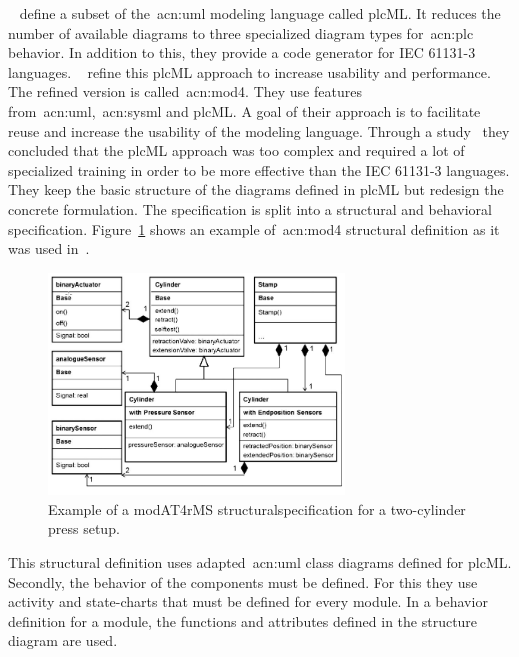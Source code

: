 \citeauthor{WITSCH2015}~\cite{WITSCH2015, WITSCH20117866} define a subset of the~\acrshort{acn:uml} modeling language called plcML.
It reduces the number of available diagrams to three specialized diagram types for~\acrshort{acn:plc} behavior.
In addition to this, they provide a code generator for IEC 61131-3 languages.
\citeauthor{Obermeier:2015aa}~\cite{Obermeier:2015aa} refine this plcML approach to increase usability and performance.
The refined version is called~\acrfull{acn:mod4}.
They use features from~\acrshort{acn:uml},~\acrshort{acn:sysml} and plcML.
A goal of their approach is to facilitate reuse and increase the usability of the modeling language.
Through a study~\cite{6315074} they concluded that the plcML approach was too complex and required a lot of specialized training in order to be more effective than the IEC 61131-3 languages.
They keep the basic structure of the diagrams defined in plcML but redesign the concrete formulation.
The specification is split into a structural and behavioral specification.
Figure~\ref{fig:modAT_struct} shows an example of~\acrshort{acn:mod4} structural definition as it was used in~\cite{Obermeier:2015aa}.
\begin{figure}[h]
	\centering
	\includegraphics[width=0.7\textwidth]{./Figures/modAT4rMS_struct.png}
	\caption[Example of a modAT4rMS structural specification for a two-cylinder press setup.]{Example of a modAT4rMS structuralspecification for a two-cylinder press setup.~\cite{Obermeier:2015aa}}
	\label{fig:modAT_struct}
\end{figure}
This structural definition uses adapted~\acrshort{acn:uml} class diagrams defined for plcML.
Secondly, the behavior of the components must be defined.
For this they use activity and state-charts that must be defined for every module.
In a behavior definition for a module, the functions and attributes defined in the structure diagram are used.
